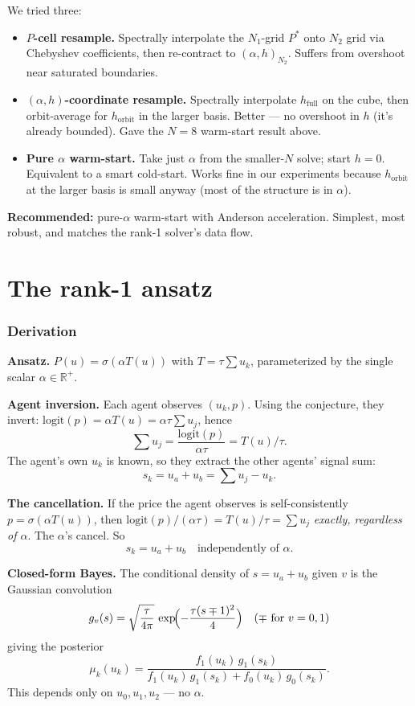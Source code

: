 \documentclass[11pt]{article}
\begin{document}
We tried three:
\begin{itemize}
\item \textbf{$P$-cell resample.} Spectrally interpolate the $N_1$-grid $P^*$ onto $N_2$
grid via Chebyshev coefficients, then re-contract to $(\alpha, h)_{N_2}$. Suffers from
overshoot near saturated boundaries.
\item \textbf{$(\alpha, h)$-coordinate resample.} Spectrally interpolate $h_{\mathrm{full}}$
on the cube, then orbit-average for $h_{\mathrm{orbit}}$ in the larger basis. Better — no
overshoot in $h$ (it's already bounded). Gave the $N=8$ warm-start result above.
\item \textbf{Pure $\alpha$ warm-start.} Take just $\alpha$ from the smaller-$N$ solve;
start $h = 0$. Equivalent to a smart cold-start. Works fine in our experiments because
$h_{\mathrm{orbit}}$ at the larger basis is small anyway (most of the structure is in
$\alpha$).
\end{itemize}

\textbf{Recommended:} pure-$\alpha$ warm-start with Anderson acceleration. Simplest, most
robust, and matches the rank-1 solver's data flow.

\newpage
\part{The rank-1 ansatz}

\section{Derivation}\label{sec:rank1-derivation}

\textbf{Ansatz.} $P(u) = \sigma(\alpha T(u))$ with $T = \tau\sum u_k$, parameterized by
the single scalar $\alpha\in\mathbb R^+$.

\textbf{Agent inversion.} Each agent observes $(u_k, p)$. Using the conjecture, they
invert: $\mathrm{logit}(p) = \alpha T(u) = \alpha\tau\sum u_j$, hence
\[
\sum u_j = \frac{\mathrm{logit}(p)}{\alpha\tau} = T(u)/\tau.
\]
The agent's own $u_k$ is known, so they extract the other agents' signal sum:
\[
s_k = u_a + u_b = \sum u_j - u_k.
\]

\textbf{The cancellation.} If the price the agent observes is self-consistently
$p = \sigma(\alpha T(u))$, then $\mathrm{logit}(p)/(\alpha\tau) = T(u)/\tau = \sum u_j$
\emph{exactly, regardless of $\alpha$}. The $\alpha$'s cancel. So
\[
s_k = u_a + u_b \quad\text{independently of $\alpha$.}
\]

\textbf{Closed-form Bayes.} The conditional density of $s = u_a + u_b$ given $v$ is the
Gaussian convolution
\[
g_v(s) = \sqrt{\frac{\tau}{4\pi}}\,\exp\!\Bigl(-\frac{\tau(s\mp 1)^2}{4}\Bigr)
\quad(\mp \text{ for } v=0,1)
\]
giving the posterior
\[
\mu_k(u_k) = \frac{f_1(u_k)\,g_1(s_k)}{f_1(u_k)\,g_1(s_k) + f_0(u_k)\,g_0(s_k)}.
\]
This depends only on $u_0, u_1, u_2$ — no $\alpha$.
\end{document}
